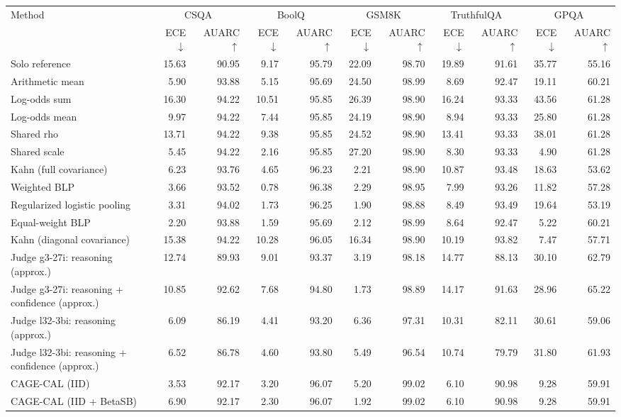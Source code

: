 \begin{tabular}{lrrrrrrrrrr}
\toprule
Method & \multicolumn{2}{c}{CSQA} & \multicolumn{2}{c}{BoolQ} & \multicolumn{2}{c}{GSM8K} & \multicolumn{2}{c}{TruthfulQA} & \multicolumn{2}{c}{GPQA} \\
 & ECE $\downarrow$ & AUARC $\uparrow$ & ECE $\downarrow$ & AUARC $\uparrow$ & ECE $\downarrow$ & AUARC $\uparrow$ & ECE $\downarrow$ & AUARC $\uparrow$ & ECE $\downarrow$ & AUARC $\uparrow$ \\
\midrule
Solo reference & 15.63 & 90.95 & 9.17 & 95.79 & 22.09 & 98.70 & 19.89 & 91.61 & 35.77 & 55.16 \\
Arithmetic mean & 5.90 & 93.88 & 5.15 & 95.69 & 24.50 & 98.99 & 8.69 & 92.47 & 19.11 & 60.21 \\
Log-odds sum & 16.30 & 94.22 & 10.51 & 95.85 & 26.39 & 98.90 & 16.24 & 93.33 & 43.56 & 61.28 \\
Log-odds mean & 9.97 & 94.22 & 7.44 & 95.85 & 24.19 & 98.90 & 8.94 & 93.33 & 25.80 & 61.28 \\
Shared rho & 13.71 & 94.22 & 9.38 & 95.85 & 24.52 & 98.90 & 13.41 & 93.33 & 38.01 & 61.28 \\
Shared scale & 5.45 & 94.22 & 2.16 & 95.85 & 27.20 & 98.90 & 8.30 & 93.33 & 4.90 & 61.28 \\
Kahn (full covariance) & 6.23 & 93.76 & 4.65 & 96.23 & 2.21 & 98.90 & 10.87 & 93.48 & 18.63 & 53.62 \\
Weighted BLP & 3.66 & 93.52 & 0.78 & 96.38 & 2.29 & 98.95 & 7.99 & 93.26 & 11.82 & 57.28 \\
Regularized logistic pooling & 3.31 & 94.02 & 1.73 & 96.25 & 1.90 & 98.88 & 8.49 & 93.49 & 19.64 & 53.19 \\
Equal-weight BLP & 2.20 & 93.88 & 1.59 & 95.69 & 2.12 & 98.99 & 8.64 & 92.47 & 5.22 & 60.21 \\
Kahn (diagonal covariance) & 15.38 & 94.22 & 10.28 & 96.05 & 16.34 & 98.90 & 10.19 & 93.82 & 7.47 & 57.71 \\
Judge g3-27i: reasoning (approx.) & 12.74 & 89.93 & 9.01 & 93.37 & 3.19 & 98.18 & 14.77 & 88.13 & 30.10 & 62.79 \\
Judge g3-27i: reasoning + confidence (approx.) & 10.85 & 92.62 & 7.68 & 94.80 & 1.73 & 98.89 & 14.17 & 91.63 & 28.96 & 65.22 \\
Judge l32-3bi: reasoning (approx.) & 6.09 & 86.19 & 4.41 & 93.20 & 6.36 & 97.31 & 10.31 & 82.11 & 30.61 & 59.06 \\
Judge l32-3bi: reasoning + confidence (approx.) & 6.52 & 86.78 & 4.60 & 93.80 & 5.49 & 96.54 & 10.74 & 79.79 & 31.80 & 61.93 \\
CAGE-CAL (IID) & 3.53 & 92.17 & 3.20 & 96.07 & 5.20 & 99.02 & 6.10 & 90.98 & 9.28 & 59.91 \\
CAGE-CAL (IID + BetaSB) & 6.90 & 92.17 & 2.30 & 96.07 & 1.92 & 99.02 & 6.10 & 90.98 & 9.28 & 59.91 \\
\bottomrule
\end{tabular}
